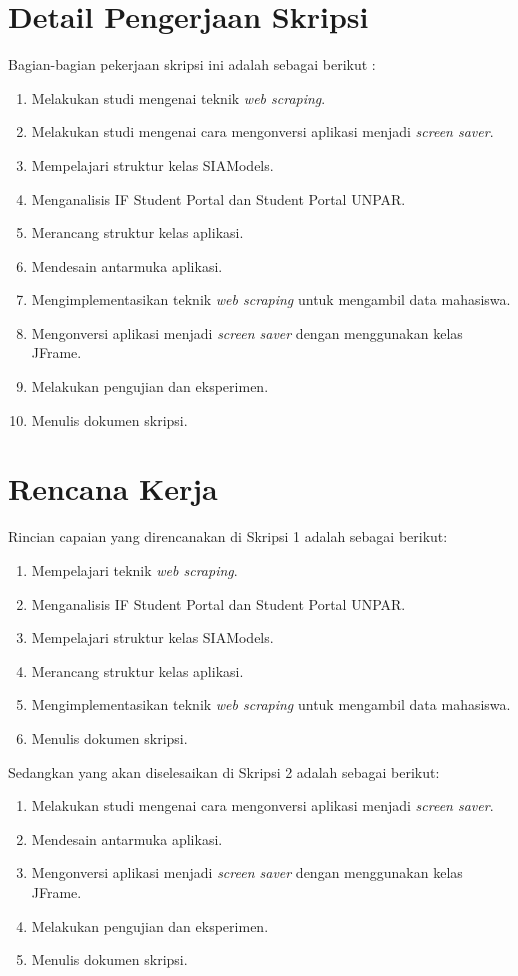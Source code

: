 \documentclass[a4paper,twoside]{article}
\begin{document}
\section{Detail Pengerjaan Skripsi}
Bagian-bagian pekerjaan skripsi ini adalah sebagai berikut :
	\begin{enumerate}
		\item Melakukan studi mengenai teknik \textit{web scraping}.
		\item Melakukan studi mengenai cara mengonversi aplikasi menjadi \textit{screen saver}.
		\item Mempelajari struktur kelas SIAModels.
		\item Menganalisis IF Student Portal dan Student Portal UNPAR.
		\item Merancang struktur kelas aplikasi.
	    \item Mendesain antarmuka aplikasi.
	    \item Mengimplementasikan teknik \textit{web scraping} untuk mengambil data mahasiswa.
        \item Mengonversi aplikasi menjadi \textit{screen saver} dengan menggunakan kelas JFrame. 
		\item Melakukan pengujian dan eksperimen.
		\item Menulis dokumen skripsi.
	\end{enumerate}

\section{Rencana Kerja}
Rincian capaian yang direncanakan di Skripsi 1 adalah sebagai berikut:
\begin{enumerate}
\item Mempelajari teknik \textit{web scraping}.
\item Menganalisis IF Student Portal dan Student Portal UNPAR.
\item Mempelajari struktur kelas SIAModels.
\item Merancang struktur kelas aplikasi.
\item Mengimplementasikan teknik \textit{web scraping} untuk mengambil data mahasiswa.
\item Menulis dokumen skripsi.
\end{enumerate}

Sedangkan yang akan diselesaikan di Skripsi 2 adalah sebagai berikut:
\begin{enumerate}
\item Melakukan studi mengenai cara mengonversi aplikasi menjadi \textit{screen saver}.
\item Mendesain antarmuka aplikasi.
\item Mengonversi aplikasi menjadi \textit{screen saver} dengan menggunakan kelas JFrame. 
\item Melakukan pengujian dan eksperimen.
\item Menulis dokumen skripsi.
\end{enumerate}
\end{document}

